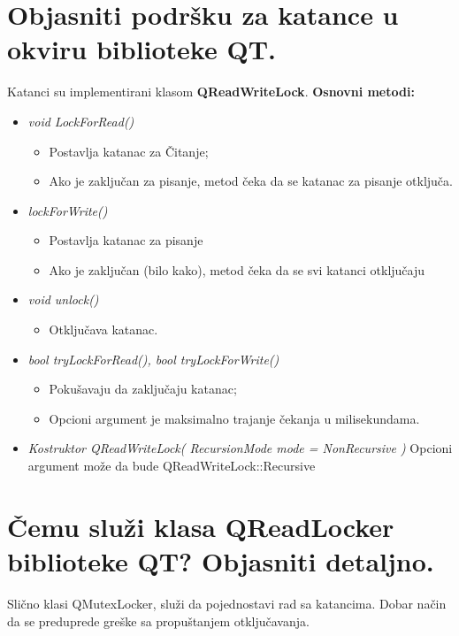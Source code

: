 \documentclass[a4paper]{article}
\begin{document}
\section{Objasniti podršku za katance u okviru biblioteke QT.}
  Katanci su implementirani klasom \textbf{QReadWriteLock}. 
  \textbf{Osnovni metodi:}
  \begin{itemize}
    \item \textit{void LockForRead()}
      \begin{itemize}
        \item Postavlja katanac za Čitanje;
        \item Ako je zaključan za pisanje, metod čeka da se katanac za pisanje otključa.
      \end{itemize}
    \item \textit{lockForWrite()}
      \begin{itemize}
        \item Postavlja katanac za pisanje
        \item Ako je zaključan (bilo kako), metod čeka da se svi katanci otključaju
      \end{itemize}
    \item \textit{void unlock()}
      \begin{itemize}
        \item Otključava katanac.
      \end{itemize}
    \item \textit{bool tryLockForRead(), bool tryLockForWrite()}
      \begin{itemize}
        \item Pokušavaju da zaključaju katanac;
        \item Opcioni argument je maksimalno trajanje čekanja u milisekundama.
      \end{itemize}
    \item \textit{Kostruktor QReadWriteLock( RecursionMode mode = NonRecursive )}
          Opcioni argument može da bude QReadWriteLock::Recursive
  \end{itemize}

\section{Čemu služi klasa QReadLocker biblioteke QT? Objasniti detaljno.}

  Slično klasi QMutexLocker, služi da pojednostavi rad sa katancima. 
  Dobar način da se preduprede greške sa propuštanjem otključavanja.
  
\end{document}
